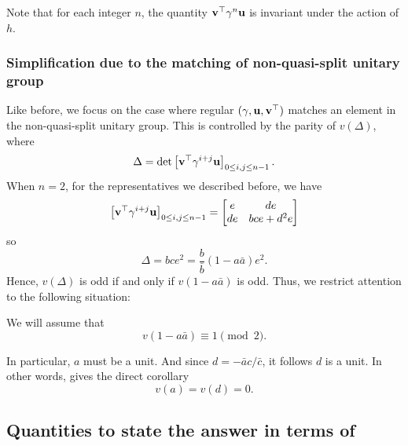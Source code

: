 \begin{remark}
  Note that for each integer $n$, the quantity $\mathbf v^\top \gamma^n \mathbf u$
  is invariant under the action of $h$.
\end{remark}

\subsubsection{Simplification due to the matching of non-quasi-split unitary group}
Like before, we focus on the case where regular $(\gamma, \mathbf u, \mathbf v^\top)$
matches an element in the non-quasi-split unitary group.
This is controlled by the parity of $v(\Delta)$, where
\[ \Delta = \det \left[ \mathbf v^\top \gamma^{i+j} \mathbf u \right]_{0 \le i,j \le n-1}. \]
When $n=2$, for the representatives we described before,
we have
\[ \left[ \mathbf v^\top \gamma^{i+j} \mathbf u \right]_{0 \le i,j \le n-1}
  = \begin{bmatrix} e & de \\ de & bce + d^2e \end{bmatrix} \]
so
\[ \Delta = bce^2 = \frac{b}{\bar b}(1-a \bar a) e^2 . \]
Hence, $v(\Delta)$ is odd if and only if $v(1-a \bar a)$ is odd.
Thus, we restrict attention to the following situation:
\begin{assume}
  We will assume that
  \[ v(1-a \bar a) \equiv 1 \pmod 2. \]
  \label{assume:a_odd}
\end{assume}
In particular, $a$ must be a unit.
And since $d = -\bar a c / \bar c$, it follows $d$ is a unit.
In other words,  gives the direct corollary
\[ v(a) = v(d) = 0. \]

\subsection{Quantities to state the answer in terms of}
